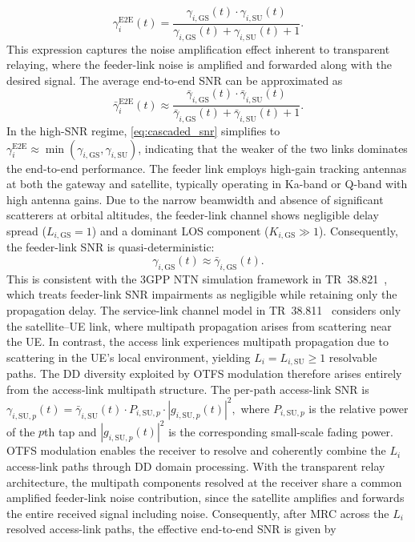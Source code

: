 \documentclass[journal]{IEEEtran}
\begin{document}
\begin{equation}
\gamma_{i}^{\mathrm{E2E}}(t) = \frac{\gamma_{i,\mathrm{GS}}(t) \cdot \gamma_{i,\mathrm{SU}}(t)}{\gamma_{i,\mathrm{GS}}(t) + \gamma_{i,\mathrm{SU}}(t) + 1}.
\label{eq:cascaded_snr}
\end{equation}
This expression captures the noise amplification effect inherent to transparent relaying, where the feeder-link noise is amplified and forwarded along with the desired signal. The average end-to-end SNR can be approximated as
\begin{equation}
\bar{\gamma}_{i}^{\mathrm{E2E}}(t) \approx \frac{\bar{\gamma}_{i,\mathrm{GS}}(t) \cdot \bar{\gamma}_{i,\mathrm{SU}}(t)}{\bar{\gamma}_{i,\mathrm{GS}}(t) + \bar{\gamma}_{i,\mathrm{SU}}(t) + 1}.
\label{eq:avg_cascaded_snr}
\end{equation}
In the high-SNR regime, \eqref{eq:cascaded_snr} simplifies to $\gamma_{i}^{\mathrm{E2E}} \approx \min(\gamma_{i,\mathrm{GS}}, \gamma_{i,\mathrm{SU}})$, indicating that the weaker of the two links dominates the end-to-end performance. The feeder link employs high-gain tracking antennas at both the gateway and satellite, typically operating in Ka-band or Q-band with high antenna gains. Due to the narrow beamwidth and absence of significant scatterers at orbital altitudes, the feeder-link channel shows negligible delay spread ($L_{i,\mathrm{GS}} = 1$) and a dominant LOS component ($K_{i,\mathrm{GS}} \gg 1$). Consequently, the feeder-link SNR is quasi-deterministic:
\begin{equation}
\gamma_{i,\mathrm{GS}}(t) \approx \bar{\gamma}_{i,\mathrm{GS}}(t).
\label{eq:feeder_deterministic}
\end{equation}
 This is consistent with the 3GPP NTN simulation framework in TR~38.821~\cite{3GPP38821}, which treats feeder-link SNR impairments as negligible while retaining only the propagation delay. The service-link channel model in TR~38.811~\cite{3GPP_TR38811} considers only the satellite--UE link, where multipath propagation arises from scattering near the UE.
In contrast, the access link experiences multipath propagation due to scattering in the UE's local environment, yielding $L_i = L_{i,\mathrm{SU}} \geq 1$ resolvable paths. The DD diversity exploited by OTFS modulation therefore arises entirely from the access-link multipath structure. The per-path access-link SNR is
$
\gamma_{i,\mathrm{SU},p}(t) = \bar{\gamma}_{i,\mathrm{SU}}(t) \cdot P_{i,\mathrm{SU},p} \cdot |g_{i,\mathrm{SU},p}(t)|^2,
$ where $P_{i,\mathrm{SU},p}$ is the relative power of the $p$th tap and $|g_{i,\mathrm{SU},p}(t)|^2$ is the corresponding small-scale fading power. OTFS modulation enables the receiver to resolve and coherently combine the $L_i$ access-link paths through DD domain processing. With the transparent relay architecture, the multipath components resolved at the receiver share a common amplified feeder-link noise contribution, since the satellite amplifies and forwards the entire received signal including noise. Consequently, after MRC across the $L_i$ resolved access-link paths, the effective end-to-end SNR is given by \cite{Hasna2003}
\end{document}

